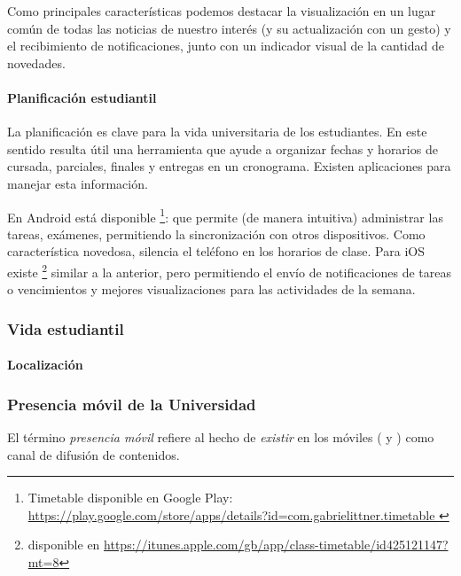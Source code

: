 Como principales características podemos destacar la visualización en un lugar común de todas las noticias de nuestro interés (y su actualización con un gesto) y el recibimiento de notificaciones, junto con un indicador visual de la cantidad de novedades.

\paragraph{Planificación estudiantil}

La planificación es clave para la vida universitaria de los estudiantes. En este sentido resulta útil una herramienta que ayude a organizar fechas y horarios
de cursada, parciales, finales y entregas en un cronograma. Existen 
aplicaciones para manejar esta información.

En Android está disponible  \footnote{Timetable disponible en Google Play: \url{https://play.google.com/store/apps/details?id=com.gabrielittner.timetable } }:
que permite (de manera intuitiva) administrar las tareas, exámenes, permitiendo la sincronización con otros dispositivos. Como característica novedosa, silencia el teléfono en los horarios
de clase.
Para iOS existe 
\footnote{ disponible en
\url{https://itunes.apple.com/gb/app/class-timetable/id425121147?mt=8} } similar
a la anterior, pero permitiendo el envío de notificaciones de tareas o
vencimientos y mejores visualizaciones para las actividades de la semana.

\subsubsection{Vida estudiantil}
\label{aplicaciones_utiles_existentes_vida}

\paragraph{Localización}
\label{aplicaciones_utiles_existentes_localizacion}

\subsubsection{Presencia móvil de la Universidad}
\label{aplicaciones_utiles_existentes_presencia}

El término \textit{presencia móvil} refiere al hecho de \textit{existir} en los móviles ( y ) como canal de difusión de contenidos\cite{presenciaMovilDef}.

